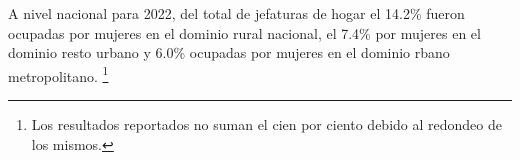 A nivel nacional para 2022, del total de jefaturas de hogar el 14.2\% fueron ocupadas por mujeres en el dominio rural nacional, el 7.4\% por mujeres en el dominio resto urbano y 6.0\% ocupadas por mujeres en el dominio rbano metropolitano. \footnote{Los resultados reportados no suman el cien por ciento debido al redondeo de los mismos.}